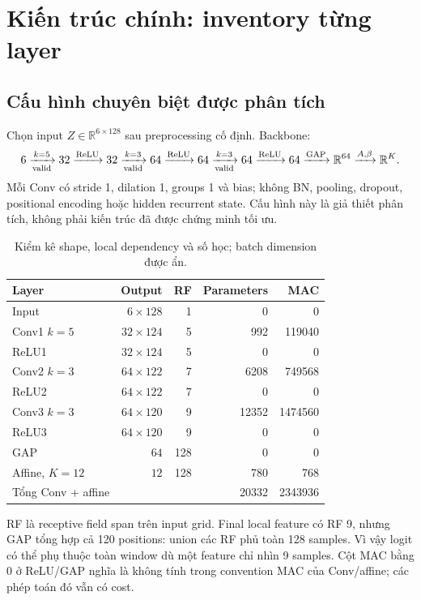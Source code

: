\documentclass[11pt,a4paper]{article}
\newcommand{\R}{\mathbb R}
\newcommand{\relu}{\operatorname{ReLU}}
\theoremstyle{definition}
\begin{document}
\section{Kiến trúc chính: inventory từng layer}
\subsection{Cấu hình chuyên biệt được phân tích}
Chọn input $Z\in\R^{6\times128}$ sau preprocessing cố định. Backbone:
\begin{equation}
6\xrightarrow[\rm valid]{k=5}32\xrightarrow{\relu}
32\xrightarrow[\rm valid]{k=3}64\xrightarrow{\relu}
64\xrightarrow[\rm valid]{k=3}64\xrightarrow{\relu}
64\xrightarrow{\rm GAP}\R^{64}\xrightarrow{A,\beta}\R^K.
\end{equation}
Mỗi Conv có stride 1, dilation 1, groups 1 và bias; không BN, pooling,
dropout, positional encoding hoặc hidden recurrent state. Cấu hình này
là giả thiết phân tích, không phải kiến trúc đã được chứng minh tối ưu.

\begin{table}[!htbp]\centering\small
\caption{Kiểm kê shape, local dependency và số học; batch dimension được ẩn.}
\label{tab:layers}
\begin{tabularx}{\linewidth}{@{}Yrrrr@{}}\toprule
Layer & Output & RF & Parameters & MAC\\\midrule
Input & $6\times128$ &1&0&0\\
Conv1 $k=5$ & $32\times124$ &5&992&119040\\
ReLU1 & $32\times124$ &5&0&0\\
Conv2 $k=3$ & $64\times122$ &7&6208&749568\\
ReLU2 & $64\times122$ &7&0&0\\
Conv3 $k=3$ & $64\times120$ &9&12352&1474560\\
ReLU3 & $64\times120$ &9&0&0\\
GAP & $64$ &128&0&0\\
Affine, $K=12$ & $12$ &128&780&768\\\midrule
Tổng Conv + affine & & &20332&2343936\\\bottomrule
\end{tabularx}
\end{table}
RF là receptive field span trên input grid. Final local feature có RF 9,
nhưng GAP tổng hợp cả 120 positions: union các RF phủ toàn 128 samples.
Vì vậy logit có thể phụ thuộc toàn window dù một feature chỉ nhìn 9
samples. Cột MAC bằng 0 ở ReLU/GAP nghĩa là không tính trong convention
MAC của Conv/affine; các phép toán đó vẫn có cost.
\end{document}
